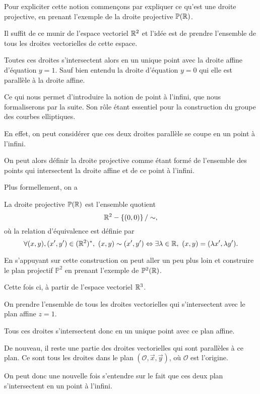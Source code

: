 Pour expliciter cette notion commençons par expliquer ce qu'est une droite projective, en
prenant l'exemple de la droite projective $\mathbb{P}(\mathbb{R})$.

Il suffit de ce munir de l'espace vectoriel $\mathbb{R}^2$ et l'idée est de prendre l'ensemble
de tous les droites vectorielles de cette espace.

Toutes ces droites
s'intersectent alors en un unique point avec la droite affine d'équation $y=1$. Sauf bien
entendu la droite d'équation $y=0$ qui elle est parallèle à la droite affine.

Ce qui nous permet d'introduire la notion de point à l'infini, que nous
formaliserons par la suite. Son rôle étant essentiel pour la construction du groupe des
courbes elliptiques.

En effet, on peut considérer que ces deux droites parallèle se coupe en un point
à l'infini.

On peut alors définir la droite projective comme étant formé de l'ensemble des points qui
intersectent la droite affine et de ce point à l'infini.

Plus formellement, on a 

\begin{definition}
   La droite projective $\mathbb{P}(\mathbb{R})$ est l'ensemble quotient 
   \[
   \mathbb{R}^2 - \left\{ (0,0) \right\} / \sim
   ,\] 
   où la relation d'équivalence est définie par
   \[
   \forall (x,y),(x',y') \in (\mathbb{R}^2)^{*},\ (x,y) \sim (x',y') \Leftrightarrow \exists \lambda \in \mathbb{R},\ (x,y)=(\lambda
   x',\lambda y')
   .\] 
\end{definition}

En s'appuyant sur cette construction on peut aller un peu plus loin et construire
le plan projectif $\mathbb{P}^2$ en prenant l'exemple de
$\mathbb{P}^2(\mathbb{R})$.

Cette fois ci, à partir de l'espace vectoriel $\mathbb{R}^3$. 

On prendre l'ensemble de tous les droites vectorielles qui
s'intersectent avec le plan affine $z=1$.

Tous ces droites s'intersectent donc en un
unique point avec ce plan affine.

De nouveau, il reste une partie des droites
vectorielles qui sont parallèles à ce plan. Ce sont tous les droites dans le plan
$(\mathcal{O},\vec{x},\vec{y})$, où $\mathcal{O}$ est l'origine.

On peut donc une nouvelle fois s'entendre sur le fait
que ces deux plan s'intersectent en un point à l'infini.

